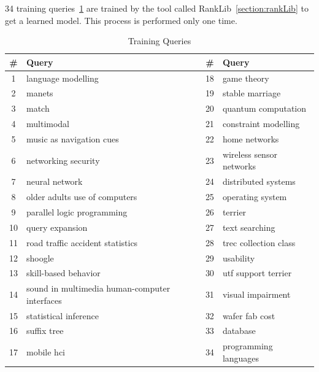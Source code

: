 34 training queries~\ref{table:trainingqueries} are trained by the tool called RankLib~\ref{section:rankLib} to get a learned model. This process is performed 
only one time.
\begin{table}
\centering
\begin{tabular}{|c|l|c|l|}
\hline \textbf{\#} & \textbf{Query} & \textbf{\#} & \textbf{Query} \\
\hline 1 & language modelling & 18 & game theory\\
\hline 2 & manets & 19 & stable marriage \\
\hline 3  & match & 20 & quantum computation\\ 
\hline 4  & multimodal & 21 & constraint modelling\\ 
\hline 5  & music as navigation cues & 22 & home networks\\ 
\hline 6  & networking security & 23 & wireless sensor networks\\ 
\hline 7  & neural network & 24 & distributed systems\\ 
\hline 8  & older adults use of computers & 25 & operating system\\ 
\hline 9  & parallel logic programming & 26 & terrier\\ 
\hline 10  & query expansion & 27 & text searching\\ 
\hline 11  & road traffic accident statistics & 28 & trec collection class\\ 
\hline 12  & shoogle & 29 & usability\\ 
\hline 13  & skill-based behavior & 30 & utf support terrier\\ 
\hline 14  & sound in multimedia human-computer interfaces & 31 & visual impairment\\ 
\hline 15  & statistical inference & 32 & wafer fab cost \\ 
\hline 16  & suffix tree & 33 & database\\ 
\hline 17  & mobile hci & 34 & programming languages\\ 
\hline
\end{tabular}
\caption{Training Queries} \label{table:trainingqueries}
\end{table}

